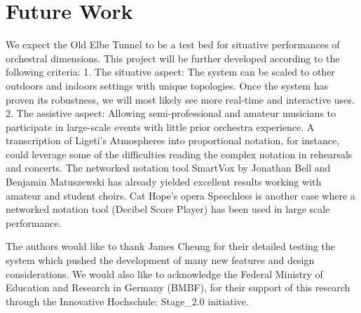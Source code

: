 \section{Future Work}
We expect the Old Elbe Tunnel to be a test bed for situative performances of orchestral dimensions. This project will be further developed according to the following criteria: 
1. The situative aspect: The system can be scaled to other outdoors and indoors settings with unique topologies. Once the system has proven its robustness, we will  most likely see more real-time and interactive uses.
2. The assistive aspect: Allowing semi-professional and amateur musicians to participate in large-scale events with little prior orchestra experience. A transcription of Ligeti's Atmospheres into proportional notation, for instance, could leverage some of the difficulties reading the complex notation in rehearsals and concerts. The networked notation tool SmartVox by Jonathan Bell and Benjamin Matuszewski \cite{bell2017smartvox} has already yielded excellent results working with amateur and student choirs. Cat Hope's opera Speechless is another case where a networked notation tool (Decibel Score Player) has been used in large scale performance.

\begin{acknowledgments}
The authors would like to thank James Cheung for their detailed testing the system which pushed the development of many new features and design considerations. We would also like to acknowledge the Federal Ministry of Education and Research in Germany (BMBF), for their support of this research through the Innovative Hochschule: Stage\_2.0 initiative.
\end{acknowledgments} 

\balance






